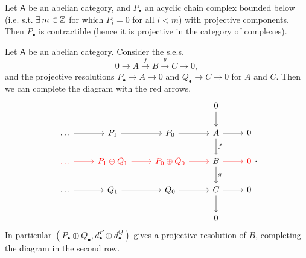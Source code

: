 \begin{lem}
	Let $\mathsf{A}$ be an abelian category, and $P_{\bullet}$ an acyclic
	chain complex bounded below (i.e. s.t. $\exists\, m \in \mathbb{Z}$ for which
	$P_i = 0$ for all $i < m$) with projective components.
	Then $P_{\bullet}$ is contractible
	(hence it is projective in the category of complexes).
\end{lem} 

\begin{lem}[Horseshoe]
	Let $\mathsf{A}$ be an abelian category.
	Consider the s.e.s.
	\begin{equation}
	0 \to A \xrightarrow{f} B \xrightarrow{g} C \to 0
	,\end{equation} 
	and the projective resolutions $P_{\bullet} \to A \to 0$ and $Q_{\bullet} \to C \to 0$
	for $A$ and $C$.
	Then we can complete the diagram with the red arrows.
	\begin{equation}
	\begin{tikzcd}
		& & & 0 \arrow[d, "", rightarrow] & \\
		\ldots \arrow[r, "", rightarrow] &
		P_1 \arrow[r, "", rightarrow] &
		P_0 \arrow[r, "", rightarrow] &
		A \arrow[r, "", rightarrow] \arrow[d, "f", rightarrow] &
		0\\
		{\color{red}\ldots} \arrow[r, red, "", rightarrow] &
		{\color{red} P_1 \oplus Q_1} \arrow[r, red, "", rightarrow] &
		{\color{red} P_0 \oplus Q_0} \arrow[r, red, "", rightarrow] &
		B \arrow[r, red, "", rightarrow] \arrow[d, "g", rightarrow] &
		{\color{red}0}\\
		\ldots \arrow[r, "", rightarrow] &
		Q_1 \arrow[r, "", rightarrow] &
		Q_0 \arrow[r, "", rightarrow] &
		C \arrow[r, "", rightarrow] \arrow[d, "", rightarrow] &
		0\\
		& & & 0 &
	\end{tikzcd}
	.\end{equation} 
	In particular $\left( P_{\bullet} \oplus Q_{\bullet}, d^P_{\bullet} \oplus d^Q_{\bullet} \right)$
	gives a projective resolution of $B$, completing the diagram in the second row.
\end{lem} 

